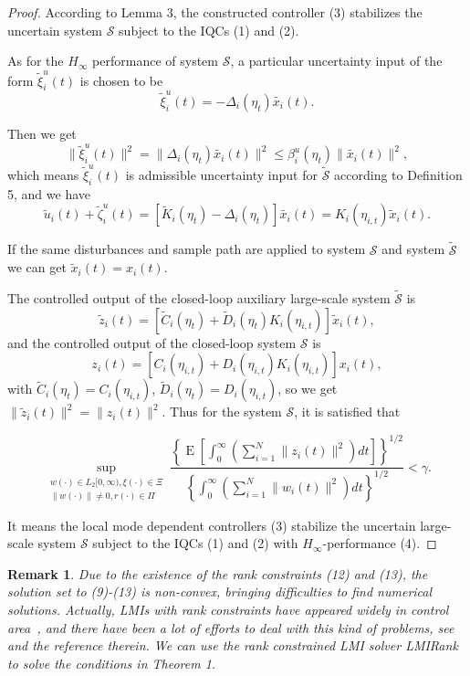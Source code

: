 \documentclass[11pt,draftcls,onecolumn]{IEEEtran}
\DeclareMathOperator{\E}{E}
\newtheorem{remark}{Remark}
\begin{document}
\begin{proof}
According to Lemma 3, the constructed controller (3) stabilizes the uncertain system $\mathcal{S}$ subject to the IQCs (1) and (2).

As for the $H_\infty$ performance of system $\mathcal{S}$,   a particular uncertainty input of the form $\tilde{\xi}_i^u(t)$ is chosen to be $$\tilde{\xi}_i^u(t)=-\Delta_i(\eta_t)\tilde{x_i}(t).$$

Then we get
$$\|\tilde{\xi}_i^u(t)\|^2=\|\Delta_i(\eta_t)\tilde{x_i}(t)\|^2\leq \beta_i^u(\eta_t)\|\tilde{x_i}(t)\|^2,$$
 which means $\tilde{\xi}_i^u(t)$ is admissible uncertainty input for $\tilde{\mathcal{S}}$ according to Definition 5, and we have
$$ \tilde{u}_i(t)+\tilde{\zeta}_i^u(t)=\left[\tilde{K}_i(\eta_t)-\Delta_i(\eta_t)\right]\tilde{x_i}(t)=K_i(\eta_{i,t})\tilde{x}_i(t).$$

 If the same disturbances and sample path are applied to system $\mathcal{S}$ and system  $\tilde{\mathcal{S}}$ we can get $\tilde{x}_i(t)=x_i(t)$.

The controlled output of the closed-loop auxiliary large-scale system  $\tilde{\mathcal{S}}$ is
$$\tilde{z}_i(t)=[\tilde{C}_i(\eta_t)+\tilde{D}_i(\eta_t)K_i(\eta_{i,t})]\tilde{x}_i(t),$$
and the controlled output of the closed-loop system  $\mathcal{S}$ is
$$z_i(t)=[C_i(\eta_{i,t})+D_i(\eta_{i,t})K_i(\eta_{i,t})]x_i(t),$$
with $\tilde{C}_i(\eta_t)=C_i(\eta_{i,t})$, $\tilde{D}_i(\eta_t)=D_i(\eta_{i,t})$, so we  get $\|\tilde{z}_i(t)\|^2=\|z_i(t)\|^2$.
Thus  for the system  $\mathcal{S}$, it is satisfied that

\begin{equation*}
\sup_{\substack{w(\cdot) \in L_2[0,\infty),\xi(\cdot)\in \Xi  \\ \|w(\cdot)\| \neq 0 , r(\cdot) \in \Pi}} \frac{\left\{\E \left[ \int_0^{\infty}(\sum_{i=1}^{N}\|z_i(t)\|^2) dt\right]\right\}^{1/2}}{\left\{\int_0^{\infty}(\sum_{i=1}^{N}\|w_i(t)\|^2) dt\right\}^{1/2}}<\gamma.
\end{equation*}

It means the local mode dependent controllers (3)  stabilize the uncertain large-scale system $\mathcal{S}$ subject to the IQCs (1)  and (2) with $H_{\infty}$-performance (4).

\end{proof}
\begin{remark}
Due to the existence of the rank constraints (12) and (13), the solution set to (9)-(13) is non-convex, bringing difficulties to find numerical solutions. Actually,
LMIs with rank constraints have appeared widely in control area~\cite{Xiong2009,li20072,Xiong2010}, and there have been a lot of efforts to deal with this kind of problems, see ~\cite{Iwasaki1995,Ghaoui1997,Orsi2006} and the reference therein. We can use the rank constrained LMI solver LMIRank~\cite{Orsi} to solve the conditions in Theorem 1.
\end{remark}
\end{document}
